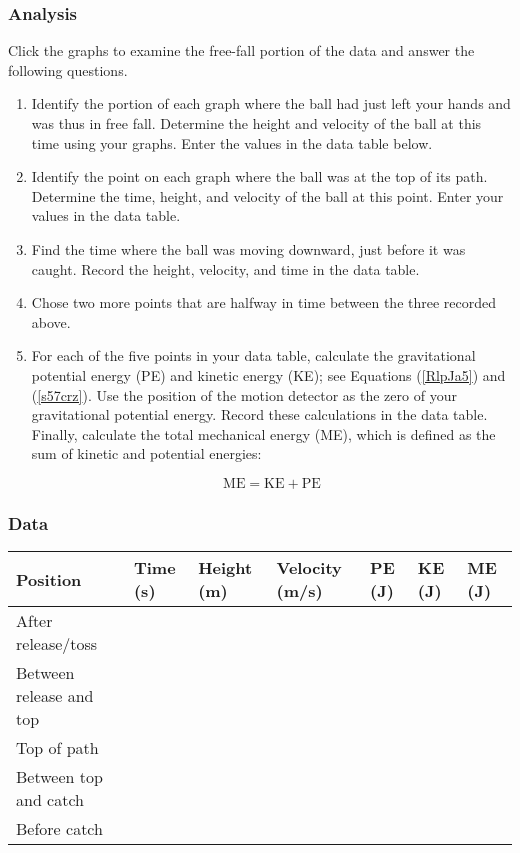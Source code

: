 \documentclass[main-physics.tex]{subfiles}
\begin{document}
\subsubsection*{Analysis}
Click the graphs to examine the free-fall portion of the data and answer the following questions.

\begin{enumerate}
\setlength\itemsep{-1ex}
    \item Identify the portion of each graph where the ball had just left your hands and was thus in free fall. Determine the height and velocity of the ball at this time using your graphs. Enter the values in the data table below.
    \item Identify the point on each graph where the ball was at the top of its path. Determine the time, height, and velocity of the ball at this point. Enter your values in the data table.
    \item Find the time where the ball was moving downward, just before it was caught. Record the height, velocity, and time in the data table.
    \item Chose two more points that are halfway in time between the three recorded above. 
    \item For each of the five points in your data table, calculate the gravitational potential energy (PE) and kinetic energy (KE); see Equations (\ref{RlpJa5}) and (\ref{s57crz}). Use the position of the motion detector as the zero of your gravitational potential energy. Record these calculations in the data table. Finally, calculate the total mechanical energy (ME), which is defined as the sum of kinetic and potential energies:

    \begin{equation}
        \mathrm{ME} = \mathrm{KE} + \mathrm{PE}
    \end{equation}
\end{enumerate}

\subsubsection*{Data}
\def\mycolwidth{1.55cm}

\vspace{1ex}
\begin{tabular}{|m{4cm}|m{\mycolwidth}|m{\mycolwidth}|m{\mycolwidth}|m{\mycolwidth}|m{\mycolwidth}|m{\mycolwidth}|}
    \hline
    \textbf{Position} & \textbf{Time} (s) & \textbf{Height} (m) & \textbf{Velocity} (m/s) & \textbf{PE} (J) & \textbf{KE} (J) & \textbf{ME} (J)\\
    \hline
    After release/toss & & & & & & \\[0.5ex]
    \hline
    Between release and top & & & & & & \\[0.5ex]
    \hline
    Top of path & & & & & & \\[0.5ex]
    \hline
    Between top and catch & & & & & & \\[0.5ex]
    \hline
    Before catch & & & & & & \\[0.5ex]
    \hline
\end{tabular}
\end{document}
